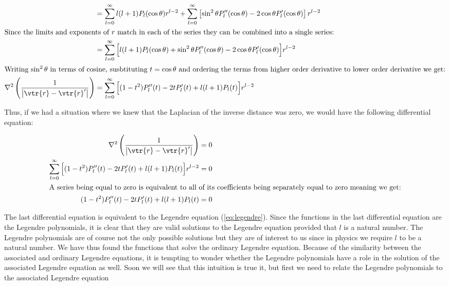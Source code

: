 \documentclass{article}
\begin{document}
\begin{align}
        &= \sum_{l=0}^{\infty}l(l + 1)P_l(\cos\theta)r^{l - 2} + \sum_{l=0}^{\infty}\left[\sin^2\theta P''_l(\cos\theta) -2\cos\theta P'_l(\cos\theta)  \right]r^{l - 2} \\
        \intertext{Since the limits and exponents of $r$ match in each of the series they can be combined into a single series:}
        &= \sum_{l=0}^{\infty}\Big[l(l + 1)P_l(\cos\theta) + \sin^2\theta P''_l(\cos\theta) - 2\cos\theta P'_l(\cos\theta)  \Big]r^{l - 2} \\
        \intertext{Writing $\sin^2\theta$ in terms of cosine, susbtituting $t = \cos\theta$ and ordering the terms from higher order derivative to lower order derivative we get:}
        \nabla^2\left(\frac{1}{\left| \vtr{r} - \vtr{r}' \right|}\right) &= \sum_{l=0}^{\infty}\Big[(1 - t^2)P''_l(t) -2tP'_l(t) + l(l + 1)P_l(t)\Big]r^{l - 2}
    \end{align}  

    Thus, if we had a situation where we knew that the Laplacian of the inverse distance was zero, we would have the following differential equation:

    \begin{align}
        \nabla^2\left(\frac{1}{\left| \vtr{r} - \vtr{r}' \right|}\right) &= 0 \\
        \sum_{l=0}^{\infty}\Big[(1 - t^2)P''_l(t) -2tP'_l(t) + l(l + 1)P_l(t)\Big]r^{l - 2} &= 0 \\
        \intertext{A series being equal to zero is equivalent to all of its coefficients being separately equal to zero meaning we get:}
        (1 - t^2)P''_l(t) - 2tP'_l(t) + l(l + 1)P_l(t) &= 0
    \end{align}

    The last differential equation is equivalent to the Legendre equation (\ref{eq:legendre}). Since the functions in the last differential equation are the Legendre polynomials,
    it is clear that they are valid solutions to the Legendre equation provided that $l$ is a natural number. The Legendre polynomials are of course not the only possible solutions but
    they are of interest to us since in physics we require $l$ to be a natural number. We have thus found the functions that solve the ordinary Legendre equation. Because of the similarity
    between the associated and ordinary Legendre equations, it is tempting to wonder whether the Legendre polynomials have a role in the solution of the associated Legendre equation as well.
    Soon we will see that this intuition is true it, but first we need to relate the Legendre polynomials to the associated Legendre equation
\end{document}
